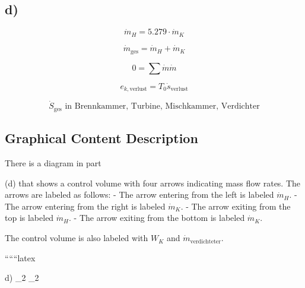 

\subsection*{d)}

\[
\dot{m}_H = 5.279 \cdot \dot{m}_K
\]

\[
\dot{m}_{\text{ges}} = \dot{m}_H + \dot{m}_K
\]

\[
0 = \sum \dot{m} \dot{m}
\]

\[
e_{k, \text{verlust}} = T_0 \dot{s}_{\text{verlust}}
\]

\[
\dot{S}_{\text{ges}} \text{ in Brennkammer, Turbine, Mischkammer, Verdichter}
\]

\subsection*{Graphical Content Description}

There is a diagram in part

(d) that shows a control volume with four arrows indicating mass flow rates. The arrows are labeled as follows:
- The arrow entering from the left is labeled $\dot{m}_H$.
- The arrow entering from the right is labeled $\dot{m}_K$.
- The arrow exiting from the top is labeled $\dot{m}_H$.
- The arrow exiting from the bottom is labeled $\dot{m}_K$.

The control volume is also labeled with $W_K$ and $\dot{m}_{\text{verdichteter}}$.

``````latex

d) \quad {}_2 \quad {} \quad {}_2
